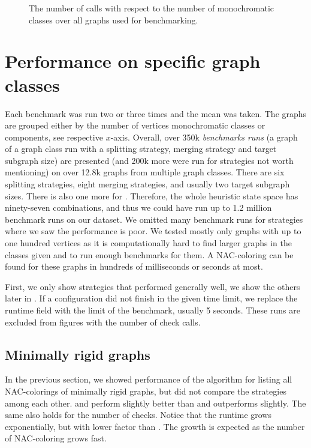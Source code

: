 \begin{figure}[ht]
	\centering
	\scalebox{\BenchFigureScale}{}
	\caption[The number of \IsNACColoring{} calls]{
		The number of \IsNACColoring{} calls with respect to the number of monochromatic classes
		over all graphs used for benchmarking.}%
	\label{fig:graph_summary}
\end{figure}%



\section{Performance on specific graph classes}%
\label{sec:bench_graph_classes}

Each benchmark was run two or three times and the mean was taken.
The graphs are grouped either by the number of vertices
monochromatic classes or \trcon{} components, see respective \(x\)-axis.
Overall, over 350k \emph{benchmarks runs}
(a graph of a graph class run with a splitting strategy, merging strategy
and target subgraph size)
are presented (and 200k more were run for strategies not worth mentioning)
on over 12.8k graphs from multiple graph classes.
%
There are six splitting strategies, eight merging strategies, and usually two target subgraph sizes.
There is also one more for \NaiveCycles{}.
Therefore, the whole heuristic state space has ninety-seven combinations,
and thus we could have run up to 1.2 million benchmark runs on our dataset.
We omitted many benchmark runs for strategies where we saw the  performance is poor.
%
We tested mostly only graphs with up to one hundred vertices
as it is computationally hard to find larger graphs in the classes given
and to run enough benchmarks for them.
A NAC-coloring can be found for these graphs
in hundreds of milliseconds or seconds at most.

First, we only show strategies that performed generally well,
we show the others later in .
If a configuration did not finish in the given time limit,
we replace the runtime field with the limit of the benchmark, usually 5 seconds.
These runs are excluded from figures with the number of check calls.


\subsection*{Minimally rigid graphs}

In the previous section, we showed performance of the algorithm for listing
all NAC-colorings of minimally rigid graphs,
but did not compare the strategies among each other.
%
\Neighbors{} and \NeighborsDegree{} perform slightly better than \None{} and
\SharedVertices{} outperforms \MergeLinear{} slightly.
The same also holds for the number of \IsNACColoring{} checks.
Notice that the runtime grows exponentially, but with lower factor than \NaiveCycles{}.
The growth is expected as the number of NAC-coloring grows fast.

